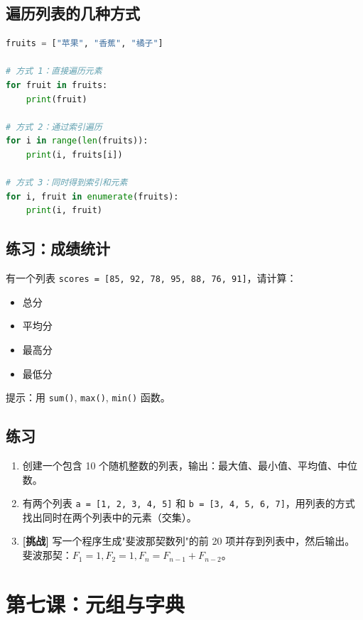 \documentclass[a4paper,12pt]{ctexart}
\begin{document}
\subsection*{遍历列表的几种方式}

\begin{lstlisting}[language=Python]
fruits = ["苹果", "香蕉", "橘子"]

# 方式 1：直接遍历元素
for fruit in fruits:
    print(fruit)

# 方式 2：通过索引遍历
for i in range(len(fruits)):
    print(i, fruits[i])

# 方式 3：同时得到索引和元素
for i, fruit in enumerate(fruits):
    print(i, fruit)
\end{lstlisting}

\subsection*{练习：成绩统计}

有一个列表 \texttt{scores = [85, 92, 78, 95, 88, 76, 91]}，请计算：
\begin{itemize}
  \item 总分
  \item 平均分
  \item 最高分
  \item 最低分
\end{itemize}

提示：用 \texttt{sum()}, \texttt{max()}, \texttt{min()} 函数。

\subsection*{练习}

\begin{enumerate}
  \item 创建一个包含 10 个随机整数的列表，输出：最大值、最小值、平均值、中位数。
  \item 有两个列表 \texttt{a = [1, 2, 3, 4, 5]} 和 \texttt{b = [3, 4, 5, 6, 7]}，用列表的方式找出同时在两个列表中的元素（交集）。
  \item \textbf{[挑战]} 写一个程序生成"斐波那契数列"的前 20 项并存到列表中，然后输出。斐波那契：$F_1=1, F_2=1, F_n = F_{n-1} + F_{n-2}$。
\end{enumerate}

\section*{第七课：元组与字典}
\end{document}
